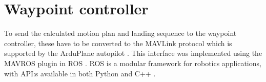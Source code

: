 \section{Waypoint controller}
To send the calculated motion plan and landing sequence to the waypoint controller, these have to be converted to the 
MAVLink protocol which is supported by the ArduPlane autopilot \cite{mavlink}. This interface was implemented using the MAVROS 
plugin in ROS \cite{mavros}. ROS is a modular framework for robotics applications, with API:s available in both Python and C++ \cite{ros}.
